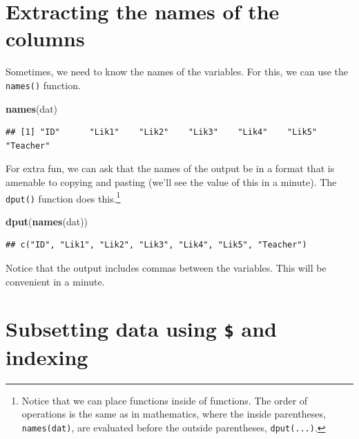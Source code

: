 \documentclass[
]{book}
\newenvironment{Shaded}{\begin{snugshade}}{\end{snugshade}}
\newcommand{\KeywordTok}[1]{\textcolor[rgb]{0.13,0.29,0.53}{\textbf{#1}}}
\newcommand{\NormalTok}[1]{#1}
\begin{document}
\hypertarget{extracting-the-names-of-the-columns}{%
\section{Extracting the names of the columns}\label{extracting-the-names-of-the-columns}}

Sometimes, we need to know the names of the variables. For this, we can use the \texttt{names()} function.

\begin{Shaded}
\begin{Highlighting}[]
\KeywordTok{names}\NormalTok{(dat)}
\end{Highlighting}
\end{Shaded}

\begin{verbatim}
## [1] "ID"      "Lik1"    "Lik2"    "Lik3"    "Lik4"    "Lik5"    "Teacher"
\end{verbatim}

For extra fun, we can ask that the names of the output be in a format that is amenable to copying and pasting (we'll see the value of this in a minute). The \texttt{dput()} function does this.\footnote{Notice that we can place functions inside of functions. The order of operations is the same as in mathematics, where the inside parentheses, \texttt{names(dat)}, are evaluated before the outside parentheses, \texttt{dput(...)}.}

\begin{Shaded}
\begin{Highlighting}[]
\KeywordTok{dput}\NormalTok{(}\KeywordTok{names}\NormalTok{(dat))}
\end{Highlighting}
\end{Shaded}

\begin{verbatim}
## c("ID", "Lik1", "Lik2", "Lik3", "Lik4", "Lik5", "Teacher")
\end{verbatim}

Notice that the output includes commas between the variables. This will be convenient in a minute.

\hypertarget{subsetting-data-using-and-indexing}{%
\section{\texorpdfstring{Subsetting data using \texttt{\$} and indexing}{Subsetting data using \$ and indexing}}\label{subsetting-data-using-and-indexing}}
\end{document}

